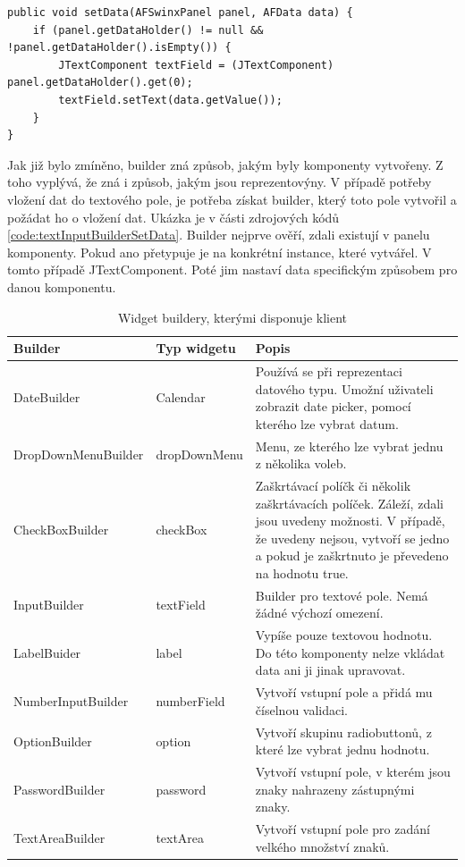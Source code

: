 \begin{lstlisting}[caption={Vložení dat do vstupního pole vytvořeného builderem.},
label={code:textInputBuilderSetData}, basicstyle=\footnotesize]
public void setData(AFSwinxPanel panel, AFData data) {
	if (panel.getDataHolder() != null && !panel.getDataHolder().isEmpty()) {
		JTextComponent textField = (JTextComponent) panel.getDataHolder().get(0);
		textField.setText(data.getValue());
	}
}
\end{lstlisting}

Jak již bylo zmíněno, builder zná způsob, jakým byly komponenty vytvořeny. Z toho vyplývá, že zná i způsob, jakým jsou reprezentovýny. V případě potřeby vložení dat do textového pole, je potřeba získat builder, který toto pole vytvořil a požádat ho o vložení dat. Ukázka je v části zdrojových kódů \ref{code:textInputBuilderSetData}. Builder nejprve ověří, zdali existují v panelu komponenty. Pokud ano přetypuje je na konkrétní instance, které vytvářel. V tomto případě JTextComponent. Poté jim nastaví data specifickým způsobem pro danou komponentu.

\begin{table}[width=\linewidth]
\begin{center}
\caption{Widget buildery, kterými disponuje klient}
\label{table:widgetBuilders}
\begin{tabular}{|p{4cm}|p{3cm}|p{7cm}|}
\hline
\textbf{Builder} & \textbf{Typ widgetu} & \textbf{Popis} \\
\hline
DateBuilder & 
Calendar & Používá se při reprezentaci datového typu. Umožní uživateli zobrazit date picker, pomocí kterého lze vybrat datum. \\
\hline
DropDownMenuBuilder &
dropDownMenu & Menu, ze kterého lze vybrat jednu z několika voleb. \\
\hline
CheckBoxBuilder & checkBox &
Zaškrtávací políčk či několik zaškrtávacích políček. Záleží, zdali jsou uvedeny možnosti. V případě, že uvedeny nejsou, vytvoří se jedno a pokud je zaškrtnuto je převedeno na hodnotu true. \\
\hline
InputBuilder & textField &
Builder pro textové pole. Nemá žádné výchozí omezení. \\
\hline
LabelBuider & label &
Vypíše pouze textovou hodnotu. Do této komponenty nelze vkládat data ani ji jinak upravovat. \\
\hline
NumberInputBuilder & numberField &
Vytvoří vstupní pole a přidá mu číselnou validaci. \\
\hline
OptionBuilder & option &
Vytvoří skupinu radiobuttonů, z které lze vybrat jednu hodnotu. \\
\hline
PasswordBuilder & password &
Vytvoří vstupní pole, v kterém jsou znaky nahrazeny zástupnými znaky. \\
\hline
TextAreaBuilder & textArea &
Vytvoří vstupní pole pro zadání velkého množství znaků. \\
\hline
\end{tabular}
\end{center}
\end{table}

